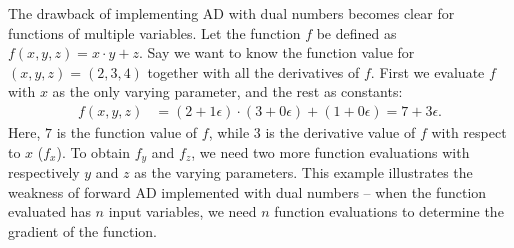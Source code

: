 The drawback of implementing AD with dual numbers becomes clear for functions of multiple variables. Let the function $f$ be defined as $f(x,y,z) = x\cdot y + z$. Say we want to know the function value for $(x,y,z) = (2,3,4)$ together with all the derivatives of $f$. First we evaluate $f$ with $x$ as the only varying parameter, and the rest as constants:
\begin{align*}
    f(x,y,z) &= (2+1\epsilon)\cdot(3+0\epsilon) + (1+0\epsilon)%
        =7+3\epsilon.
\end{align*}
Here, $7$ is the function value of $f$, while $3$ is the derivative value of $f$ with respect to $x$ ($f_x$). To obtain $f_y$ and $f_z$, we need two more function evaluations with respectively $y$ and $z$ as the varying parameters. This example illustrates the weakness of forward AD implemented with dual numbers -- when the function evaluated has $n$ input variables, we need $n$ function evaluations to determine the gradient of the function.

